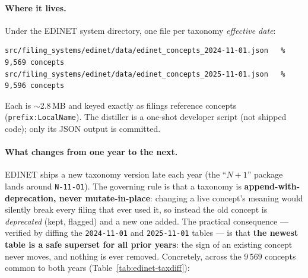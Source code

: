 \documentclass[11pt,a4paper]{report}
\begin{document}
\paragraph{Where it lives.} Under the EDINET system directory, one file per taxonomy \emph{effective date}:
\begin{lstlisting}
src/filing_systems/edinet/data/edinet_concepts_2024-11-01.json   % 9,569 concepts
src/filing_systems/edinet/data/edinet_concepts_2025-11-01.json   % 9,596 concepts
\end{lstlisting}
\noindent Each is $\sim$2.8\,MB and keyed exactly as filings reference concepts (\texttt{prefix:LocalName}).
The distiller is a one-shot developer script (not shipped code); only its JSON output is committed.

\paragraph{What changes from one year to the next.} EDINET ships a new taxonomy version late each year
(the ``\(N{+}1\)'' package lands around \texttt{N-11-01}). The governing rule is that a taxonomy is
\textbf{append-with-deprecation, never mutate-in-place}: changing a live concept's meaning would silently
break every filing that ever used it, so instead the old concept is \emph{deprecated} (kept, flagged) and a
new one added. The practical consequence --- verified by diffing the \texttt{2024-11-01} and
\texttt{2025-11-01} tables --- is that \textbf{the newest table is a safe superset for all prior years}:
the sign of an existing concept never moves, and nothing is ever removed. Concretely, across the
\(9\,569\) concepts common to both years (Table~\ref{tab:edinet-taxdiff}):
\end{document}
